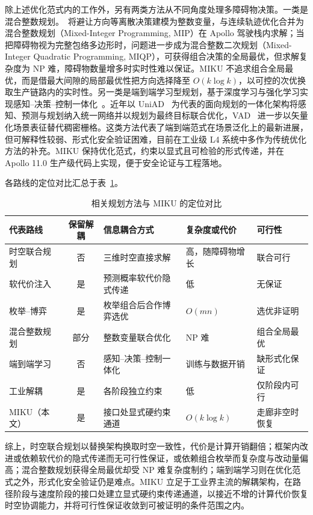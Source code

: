 \documentclass[a4paper,11pt]{ctexart}
\theoremstyle{definition}
\begin{document}
除上述优化范式内的工作外，另有两类方法从不同角度处理多障碍物决策。一类是混合整数规划。\citet{kessler2023}~将避让方向等离散决策建模为整数变量，与连续轨迹优化合并为混合整数规划（Mixed-Integer Programming, MIP）在 Apollo 驾驶栈内求解；当把障碍物视为完整包络多边形时，问题进一步成为混合整数二次规划（Mixed-Integer Quadratic Programming, MIQP），可获得组合决策的全局最优，但求解复杂度为 NP 难，障碍物数量增多时实时性难以保证。MIKU 不追求组合全局最优，而是借最大间隙的局部最优性把方向选择降至 $O(k\log k)$，以可控的次优换取生产链路内的实时性。另一类是端到端学习型规划，基于深度学习与强化学习实现感知--决策--控制一体化~\citep{li2024decision,zhang2018autonomous}。近年以 UniAD~\citep{hu2023uniad} 为代表的面向规划的一体化架构将感知、预测与规划纳入统一网络并以规划为最终目标联合优化，VAD~\citep{jiang2023vad} 进一步以矢量化场景表征替代稠密栅格。这类方法代表了端到端范式在场景泛化上的最新进展，但可解释性较弱、形式化安全验证困难，目前在工业级 L4 系统中多作为传统优化方法的补充。MIKU 保持优化范式，约束以显式且可检验的形式传递，并在 Apollo 11.0 生产级代码上实现，便于安全论证与工程落地。

各路线的定位对比汇总于表~\ref{tab:related}。

\begin{table}[t]
\centering
\footnotesize
\setlength{\tabcolsep}{4pt}
\caption{相关规划方法与 MIKU 的定位对比}
\label{tab:related}
\begin{tabular}{@{}lcp{3.0cm}p{2.6cm}p{2.8cm}@{}}
\toprule
代表路线 & 保留解耦 & 信息耦合方式 & 复杂度或代价 & 可行性 \\
\midrule
时空联合规划 & 否 & 三维时空直接求解 & 高，随障碍物增长 & 联合可行 \\
软代价注入 & 是 & 预测概率软代价隐式传递 & 低 & 无保证 \\
枚举--博弈 & 是 & 枚举组合后合作博弈选优 & $O(mn)$ & 选优非证明 \\
混合整数规划 & 部分 & 整数变量联合优化 & NP 难 & 组合全局最优 \\
端到端学习 & 否 & 感知--决策--控制一体化 & 训练与数据开销 & 缺形式化保证 \\
工业解耦 & 是 & 各阶段独立约束 & 低 & 仅阶段内可行 \\
MIKU（本文） & 是 & 接口处显式硬约束通道 & $O(k\log k)$ & 走廊非空时恢复 \\
\bottomrule
\end{tabular}
\end{table}

综上，时空联合规划以替换架构换取时空一致性，代价是计算开销翻倍；框架内改进或依赖软代价的隐式传递而无可行性保证，或依赖组合枚举而复杂度与改动量偏高；混合整数规划获得全局最优却受 NP 难复杂度制约；端到端学习则在优化范式之外，形式化安全验证仍是难点。MIKU 立足于工业界主流的解耦架构，在路径阶段与速度阶段的接口处建立显式硬约束传递通道，以接近不增的计算代价恢复时空协调能力，并将可行性保证收敛到可被证明的条件范围之内。
\end{document}
